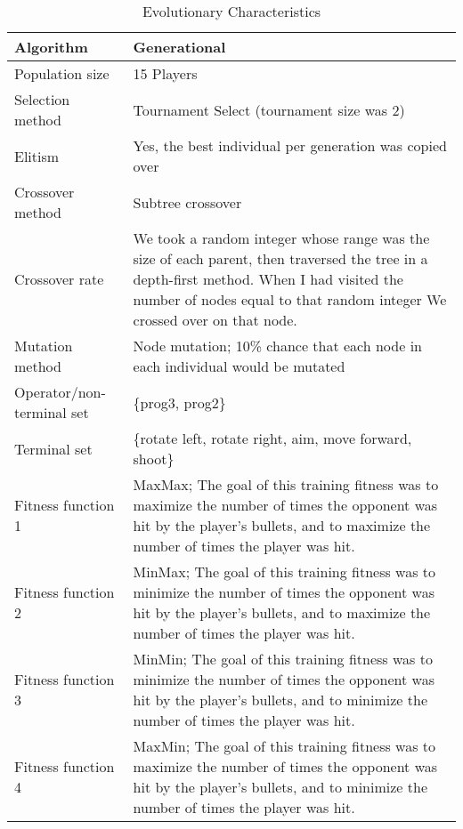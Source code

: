\documentclass{acm_proc_article-sp}
\begin{document}
\begin{table*}
\centering
\caption{Evolutionary Characteristics}
\label{evochar}
\begin{tabular}{|l|p{4in}|}
\hline
Algorithm & Generational\\
\hline
Population size & 15 Players\\
\hline
Selection method & Tournament Select (tournament size was 2)\\
\hline
Elitism & Yes, the best individual per generation was copied over\\
\hline
Crossover method & Subtree crossover\\
\hline
Crossover rate & We took a random integer whose range was the size of each parent, then traversed the tree in a depth-first method. When I had visited the number of nodes equal to that random integer We crossed over on that node.\\
\hline
Mutation method & Node mutation; 10\% chance that each node in each individual would be mutated\\
\hline
Operator/non-terminal set & \{prog3, prog2\}\\
\hline
Terminal set & \{rotate left, rotate right, aim, move forward, shoot\}\\
\hline
Fitness function 1 & MaxMax; The goal of this training fitness was to maximize the number of times the opponent was hit by the player's bullets, and to maximize the number of times the player was hit. \\
\hline
Fitness function 2 & MinMax; The goal of this training fitness was to minimize the number of times the opponent was hit by the player's bullets, and to maximize the number of times the player was hit. \\
\hline
Fitness function 3 & MinMin; The goal of this training fitness was to minimize the number of times the opponent was hit by the player's bullets, and to minimize the number of times the player was hit. \\
\hline
Fitness function 4 & MaxMin; The goal of this training fitness was to maximize the number of times the opponent was hit by the player's bullets, and to minimize the number of times the player was hit. \\
\hline
\end{tabular}
\end{table*}
\end{document}
